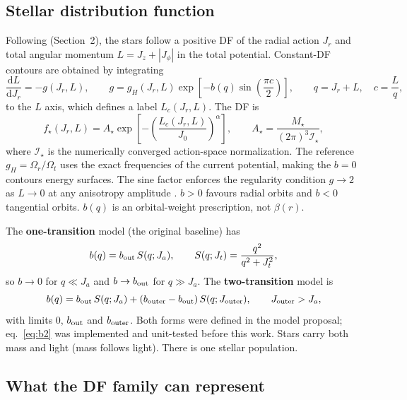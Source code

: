 \documentclass[11pt,a4paper]{article}
\newcommand{\dd}{\mathrm{d}}
\begin{document}
\subsection{Stellar distribution function}

Following  (Section~2), the stars follow a
positive DF of the radial action $J_r$ and total angular momentum
$L=J_z+|J_\phi|$ in the total potential. Constant-DF contours are obtained
by integrating
\begin{equation}
 \frac{\dd L}{\dd J_r}=-g(J_r,L),\qquad
 g=g_H(J_r,L)\exp\left[-b(q)\sin\left(\frac{\pi c}{2}\right)\right],\qquad
 q=J_r+L,\quad c=\frac{L}{q},
 \label{eq:g}
\end{equation}
to the $L$ axis, which defines a label $L_c(J_r,L)$. The DF is
\begin{equation}
 f_\star(J_r,L)=A_\star\exp\left[-\left(\frac{L_c(J_r,L)}{J_0}\right)^\alpha\right],
 \qquad A_\star=\frac{M_\star}{(2\pi)^3\mathcal I_\star},
 \label{eq:df}
\end{equation}
where $\mathcal I_\star$ is the numerically converged action-space normalization.
The reference $g_H=\Omega_r/\Omega_t$ uses the exact frequencies of the
current potential, making the $b=0$ contours energy surfaces. The sine factor
enforces the regularity condition $g\to2$ as $L\to0$ at any anisotropy
amplitude \citep{2026MNRAS.549ag854B}. $b>0$ favours radial orbits and $b<0$
tangential orbits. $b(q)$ is an orbital-weight prescription, not $\beta(r)$.

The \textbf{one-transition} model (the original baseline) has
\begin{equation}
 b(q)=b_{\rm out}\,S(q;J_a),\qquad S(q;J_t)=\frac{q^2}{q^2+J_t^2},
 \label{eq:b1}
\end{equation}
so $b\to0$ for $q\ll J_a$ and $b\to b_{\rm out}$ for $q\gg J_a$. The
\textbf{two-transition} model is
\begin{equation}
 b(q)=b_{\rm out}\,S(q;J_a)+(b_{\rm outer}-b_{\rm out})\,S(q;J_{\rm outer}),
 \qquad J_{\rm outer}>J_a,
 \label{eq:b2}
\end{equation}
with limits $0$, $b_{\rm out}$ and $b_{\rm outer}$. Both forms were defined in
the model proposal; eq.~\eqref{eq:b2} was implemented and unit-tested before
this work. Stars carry both mass and light (mass follows light). There is one
stellar population.

\subsection{What the DF family can represent}
\label{sec:family}
\end{document}
